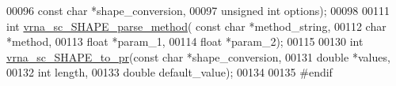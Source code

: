 \begin{DoxyCode}
00096                                     \textcolor{keyword}{const} \textcolor{keywordtype}{char} *shape\_conversion,
00097                                     \textcolor{keywordtype}{unsigned} \textcolor{keywordtype}{int} options);
00098 
00111 \textcolor{keywordtype}{int} \hyperlink{constraints__SHAPE_8h_a71b84eb0dd69e5c256f4ecf8f78cf314}{vrna\_sc\_SHAPE\_parse\_method}( \textcolor{keyword}{const} \textcolor{keywordtype}{char} *method\_string,
00112                                 \textcolor{keywordtype}{char} *method,
00113                                 \textcolor{keywordtype}{float} *param\_1,
00114                                 \textcolor{keywordtype}{float} *param\_2);
00115 
00130 \textcolor{keywordtype}{int} \hyperlink{group__SHAPE__reactivities_ga67675b3ed48744489a3bcfa4174197cb}{vrna\_sc\_SHAPE\_to\_pr}(\textcolor{keyword}{const} \textcolor{keywordtype}{char} *shape\_conversion,
00131                         \textcolor{keywordtype}{double} *values,
00132                         \textcolor{keywordtype}{int} length,
00133                         \textcolor{keywordtype}{double} default\_value);
00134 
00135 \textcolor{preprocessor}{#endif}
\end{DoxyCode}
